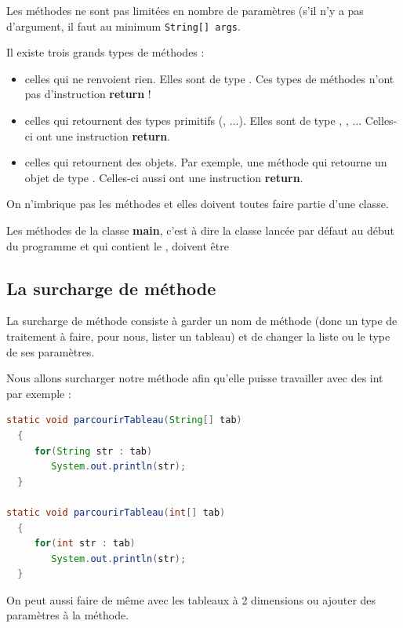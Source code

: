 \documentclass[a4paper,twoside]{article}
\begin{document}
Les méthodes ne sont pas limitées en nombre de paramètres (s'il n'y a pas d'argument, il faut au minimum \og \texttt{String[] args}\fg.

Il existe trois grands types de méthodes : 
\begin{itemize}
\item celles qui ne renvoient rien. Elles sont de type . Ces types de méthodes n'ont pas d'instruction \textbf{return} !
\item celles qui retournent des types primitifs (, ...). Elles sont de type , , ... Celles-ci ont une instruction \textbf{return}.
\item celles qui retournent des objets. Par exemple, une méthode qui retourne un objet de type . Celles-ci aussi ont une instruction \textbf{return}.
\end{itemize}

\bigskip

\begin{remarque}
On n'imbrique pas les méthodes et elles doivent toutes faire partie d'une classe. 
\end{remarque}

\begin{attention}
Les méthodes de la classe \textbf{main}, c'est à dire la classe lancée par défaut au début du programme et qui contient le , doivent être 
\end{attention}

\subsection{La surcharge de méthode}
La surcharge de méthode consiste à garder un nom de méthode (donc un type de traitement à faire, pour nous, lister un tableau) et de changer la liste ou le type de ses paramètres.

Nous allons surcharger notre méthode afin qu'elle puisse travailler avec des int par exemple :
\begin{lstlisting}[language=java]
static void parcourirTableau(String[] tab)
  {
     for(String str : tab)
        System.out.println(str);
  }
        
static void parcourirTableau(int[] tab)
  {
     for(int str : tab)
        System.out.println(str);
  }
\end{lstlisting}

On peut aussi faire de même avec les tableaux à 2 dimensions ou ajouter des paramètres à la méthode.




\printindex
\end{document}
